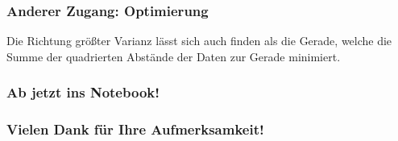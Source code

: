 \begin{frame}
\frametitle{Anderer Zugang: Optimierung}
Die Richtung größter Varianz lässt sich auch finden als die Gerade,
welche die Summe der quadrierten Abstände der Daten zur Gerade minimiert.


\end{frame}


\begin{frame}
\frametitle{Ab jetzt ins Notebook!}
\end{frame}


\begin{frame}[separator]
  \frametitle{Vielen Dank für Ihre Aufmerksamkeit!}
\end{frame}



